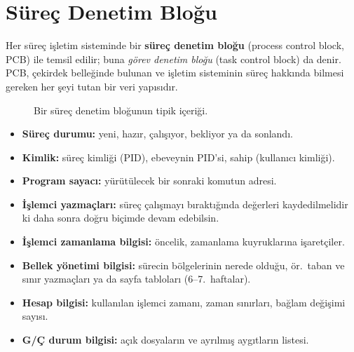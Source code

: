 \documentclass[11pt,a4paper]{article}
\newcommand{\term}[1]{\textbf{\color{mintdeep}#1}}
\begin{document}
\section{Süreç Denetim Bloğu}
\label{sec:pcb}

Her süreç işletim sisteminde bir \term{süreç denetim bloğu} (process control block, PCB) ile temsil edilir; buna \emph{görev denetim bloğu} (task control block) da denir. PCB, çekirdek belleğinde bulunan ve işletim sisteminin süreç hakkında bilmesi gereken her şeyi tutan bir veri yapısıdır.

\begin{figure}[H]
\centering
{}
\caption{Bir süreç denetim bloğunun tipik içeriği.}
\end{figure}

\begin{itemize}
  \item \textbf{Süreç durumu:} yeni, hazır, çalışıyor, bekliyor ya da sonlandı.
  \item \textbf{Kimlik:} süreç kimliği (PID), ebeveynin PID'si, sahip (kullanıcı kimliği).
  \item \textbf{Program sayacı:} yürütülecek bir sonraki komutun adresi.
  \item \textbf{İşlemci yazmaçları:} süreç çalışmayı bıraktığında değerleri kaydedilmelidir ki daha sonra doğru biçimde devam edebilsin.
  \item \textbf{İşlemci zamanlama bilgisi:} öncelik, zamanlama kuyruklarına işaretçiler.
  \item \textbf{Bellek yönetimi bilgisi:} sürecin bölgelerinin nerede olduğu, ör.\ taban ve sınır yazmaçları ya da sayfa tabloları (6--7.~haftalar).
  \item \textbf{Hesap bilgisi:} kullanılan işlemci zamanı, zaman sınırları, bağlam değişimi sayısı.
  \item \textbf{G/Ç durum bilgisi:} açık dosyaların ve ayrılmış aygıtların listesi.
\end{itemize}
\end{document}
